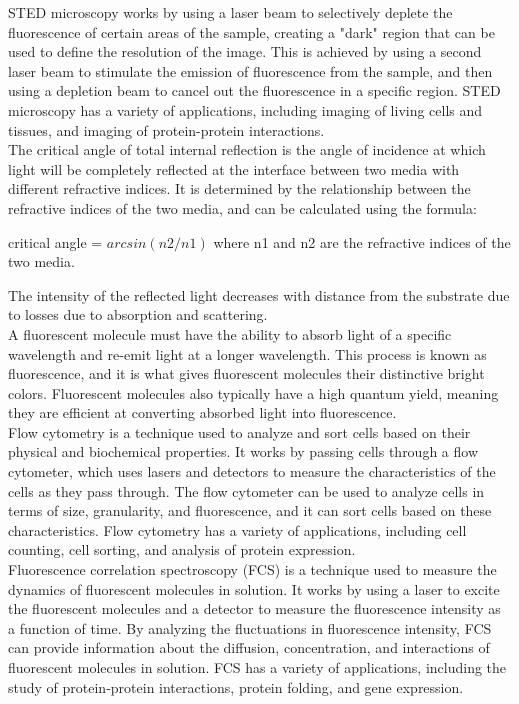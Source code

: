 \documentclass{article}
\begin{document}
STED microscopy works by using a laser beam to selectively deplete the fluorescence of certain areas of the sample, creating a "dark" region that can be used to define the resolution of the image. This is achieved by using a second laser beam to stimulate the emission of fluorescence from the sample, and then using a depletion beam to cancel out the fluorescence in a specific region. STED microscopy has a variety of applications, including imaging of living cells and tissues, and imaging of protein-protein interactions.\\

The critical angle of total internal reflection is the angle of incidence at which light will be completely reflected at the interface between two media with different refractive indices. It is determined by the relationship between the refractive indices of the two media, and can be calculated using the formula:

critical angle = $arcsin(n2/n1)$
where n1 and n2 are the refractive indices of the two media.

The intensity of the reflected light decreases with distance from the substrate due to losses due to absorption and scattering.\\

A fluorescent molecule must have the ability to absorb light of a specific wavelength and re-emit light at a longer wavelength. This process is known as fluorescence, and it is what gives fluorescent molecules their distinctive bright colors. Fluorescent molecules also typically have a high quantum yield, meaning they are efficient at converting absorbed light into fluorescence.\\

Flow cytometry is a technique used to analyze and sort cells based on their physical and biochemical properties. It works by passing cells through a flow cytometer, which uses lasers and detectors to measure the characteristics of the cells as they pass through. The flow cytometer can be used to analyze cells in terms of size, granularity, and fluorescence, and it can sort cells based on these characteristics. Flow cytometry has a variety of applications, including cell counting, cell sorting, and analysis of protein expression.\\

Fluorescence correlation spectroscopy (FCS) is a technique used to measure the dynamics of fluorescent molecules in solution. It works by using a laser to excite the fluorescent molecules and a detector to measure the fluorescence intensity as a function of time. By analyzing the fluctuations in fluorescence intensity, FCS can provide information about the diffusion, concentration, and interactions of fluorescent molecules in solution. FCS has a variety of applications, including the study of protein-protein interactions, protein folding, and gene expression.\\
\end{document}
